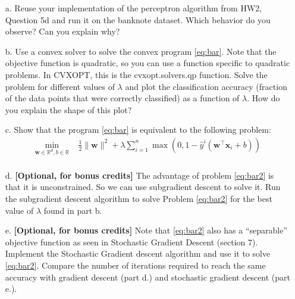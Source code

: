 \documentclass[11pt]{article}
\theoremstyle{remark}
\newcommand{\R}{\mathbb{R}}                     %
\newcommand{\bx}{\mathbf{x}}
\newcommand{\bw}{\mathbf{w}}
\begin{document}
\begin{itemize}
    \item[a.] Reuse your implementation of the perceptron algorithm
      from HW2, Question 5d and run it
        on the banknote dataset. Which behavior do you observe? Can you explain
        why?
    \item[b.] Use a convex solver to solve the convex program \eqref{eq:bar}.
        Note that the objective function is quadratic, so you can use
        a function specific to quadratic problems. In CVXOPT, this is the
        \textsf{cvxopt.solvers.qp} function. Solve the problem for different
        values of $\lambda$ and plot the classification accuracy
        (fraction of the data points that were correctly classified)
        as a function of $\lambda$. How do you explain the shape of this plot?
    \item[c.] Show that the program \eqref{eq:bar} is equivalent to the
        following problem:
\begin{equation}
    \label{eq:bar2}
    \begin{aligned}
        \min_{\bw\in\R^d, b\in \R}&\; \frac{1}{2}\|\bw\|^2
        + \lambda\sum_{i=1}^n\max(0,1-\hat{y}^i (\bw^\intercal\bx_i +b))\\
    \end{aligned}
\end{equation}
\item[d.]\textbf{[Optional, for bonus credits]} The advantage of problem
    \eqref{eq:bar2} is that it is unconstrained. So we can use subgradient
    descent to solve it. Run the subgradient descent algorithm to solve Problem
    \eqref{eq:bar2} for the best value of $\lambda$ found in part b.
\item[e.]\textbf{[Optional, for bonus credits]} Note that \eqref{eq:bar2} also
    has a ``separable'' objective function as seen in Stochastic Gradient
    Descent (section 7). Implement the Stochastic Gradient descent algorithm
    and use it to solve \eqref{eq:bar2}. Compare the number of iterations
    required to reach the same accuracy with gradient descent (part d.) and
    stochastic gradient descent (part e.).
\end{itemize}
\end{document}

